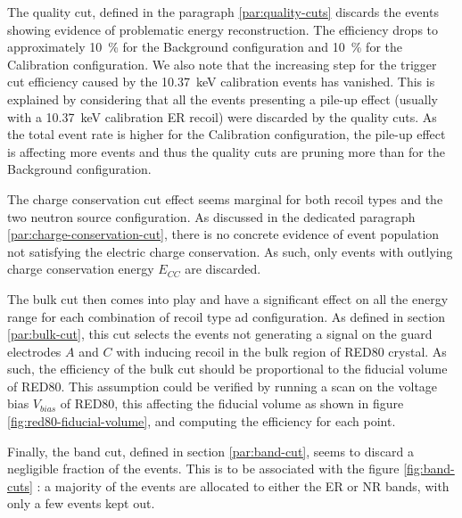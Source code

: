The quality cut, defined in the paragraph \ref{par:quality-cuts} discards the events showing evidence of problematic energy reconstruction. The efficiency drops to approximately \SI{10}{\percent} for the Background configuration and \SI{10}{\percent} for the Calibration configuration. We also note that the increasing step for the trigger cut efficiency caused by the \SI{10.37}{\kilo\eV} calibration events has vanished. This is explained by considering that all the events presenting a pile-up effect (usually with a \SI{10.37}{\kilo\eV} calibration ER recoil) were discarded by the quality cuts. As the total event rate is higher for the Calibration configuration, the pile-up effect is affecting more events and thus the quality cuts are pruning more than for the Background configuration.

The charge conservation cut effect seems marginal for both recoil types and the two neutron source configuration. As discussed in the dedicated paragraph \ref{par:charge-conservation-cut}, there is no concrete evidence of event population not satisfying the electric charge conservation. As such, only events with outlying charge conservation energy $E_{CC}$ are discarded.


The bulk cut then comes into play and have a significant effect on all the energy range for each combination of recoil type ad configuration. As defined in section \ref{par:bulk-cut}, this cut selects the events not generating a signal on the guard electrodes $A$ and $C$ with inducing recoil in the bulk region of RED80 crystal. As such, the efficiency of the bulk cut should be proportional to the fiducial volume of RED80. This assumption could be verified by running a scan on the voltage bias $V_{bias}$ of RED80, this affecting the fiducial volume as shown in figure \ref{fig:red80-fiducial-volume}, and computing the efficiency for each point.

Finally, the band cut, defined in section \ref{par:band-cut}, seems to discard a negligible fraction of the events. This is to be associated with the figure \ref{fig:band-cuts} : a majority of the events are allocated to either the ER or NR bands, with only a few events kept out.


